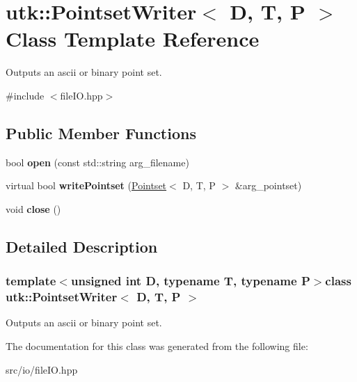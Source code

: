 \hypertarget{classutk_1_1PointsetWriter}{\section{utk\-:\-:Pointset\-Writer$<$ D, T, P $>$ Class Template Reference}
\label{classutk_1_1PointsetWriter}
}


Outputs an ascii or binary point set.  




{\ttfamily \#include $<$file\-I\-O.\-hpp$>$}

\subsection*{Public Member Functions}
\begin{DoxyCompactItemize}
\item 
\hypertarget{classutk_1_1PointsetWriter_ae5bb1fee762747382d5c17d537212c8b}{bool {\bfseries open} (const std\-::string arg\-\_\-filename)}\label{classutk_1_1PointsetWriter_ae5bb1fee762747382d5c17d537212c8b}

\item 
\hypertarget{classutk_1_1PointsetWriter_ae89f494289b002d9cfc3bb57d734e1d4}{virtual bool {\bfseries write\-Pointset} (\hyperlink{classutk_1_1Pointset}{Pointset}$<$ D, T, P $>$ \&arg\-\_\-pointset)}\label{classutk_1_1PointsetWriter_ae89f494289b002d9cfc3bb57d734e1d4}

\item 
\hypertarget{classutk_1_1PointsetWriter_a0ab938eebea5b1906ebb2677ca203637}{void {\bfseries close} ()}\label{classutk_1_1PointsetWriter_a0ab938eebea5b1906ebb2677ca203637}

\end{DoxyCompactItemize}


\subsection{Detailed Description}
\subsubsection*{template$<$unsigned int D, typename T, typename P$>$class utk\-::\-Pointset\-Writer$<$ D, T, P $>$}

Outputs an ascii or binary point set. 

The documentation for this class was generated from the following file\-:\begin{DoxyCompactItemize}
\item 
src/io/file\-I\-O.\-hpp\end{DoxyCompactItemize}
